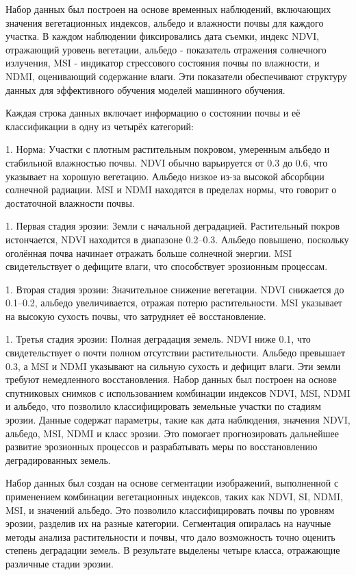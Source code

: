 Набор данных был построен на основе временных наблюдений, включающих
значения вегетационных индексов, альбедо и влажности почвы для каждого
участка. В каждом наблюдении фиксировались дата съемки, индекс NDVI,
отражающий уровень вегетации, альбедо - показатель отражения солнечного
излучения, MSI - индикатор стрессового состояния почвы по влажности, и
NDMI, оценивающий содержание влаги. Эти показатели обеспечивают
структуру данных для эффективного обучения моделей машинного обучения.

Каждая строка данных включает информацию о состоянии почвы и её
классификации в одну из четырёх категорий:


1. Норма: Участки с плотным растительным покровом, умеренным
альбедо и стабильной влажностью почвы. NDVI обычно варьируется от 0.3
до 0.6, что указывает на хорошую вегетацию. Альбедо низкое из-за
высокой абсорбции солнечной радиации. MSI и NDMI находятся в пределах
нормы, что говорит о достаточной влажности почвы.

1. Первая стадия эрозии: Земли с начальной деградацией.
Растительный покров истончается, NDVI находится в диапазоне 0.2--0.3.
Альбедо повышено, поскольку оголённая почва начинает отражать больше
солнечной энергии. MSI свидетельствует о дефиците влаги, что
способствует эрозионным процессам.

1. Вторая стадия эрозии: Значительное снижение вегетации. NDVI
снижается до 0.1--0.2, альбедо увеличивается, отражая потерю
растительности. MSI указывает на высокую сухость почвы, что затрудняет
её восстановление.

1. Третья стадия эрозии: Полная деградация земель. NDVI ниже
0.1, что свидетельствует о почти полном отсутствии растительности.
Альбедо превышает 0.3, а MSI и NDMI указывают на сильную сухость и
дефицит влаги. Эти земли требуют немедленного восстановления.
Набор данных был построен на основе спутниковых снимков с использованием
комбинации индексов NDVI, MSI, NDMI и альбедо, что позволило
классифицировать земельные участки по стадиям эрозии. Данные содержат
параметры, такие как дата наблюдения, значения NDVI, альбедо, MSI, NDMI
и класс эрозии. Это помогает прогнозировать дальнейшее развитие
эрозионных процессов и разрабатывать меры по восстановлению
деградированных земель.

Набор данных был создан на основе сегментации изображений, выполненной с
применением комбинации вегетационных индексов, таких как NDVI, SI, NDMI,
MSI, и значений альбедо. Это позволило классифицировать почвы по уровням
эрозии, разделив их на разные категории. Сегментация опиралась на
научные методы анализа растительности и почвы, что дало возможность
точно оценить степень деградации земель. В результате выделены четыре
класса, отражающие различные стадии эрозии.


